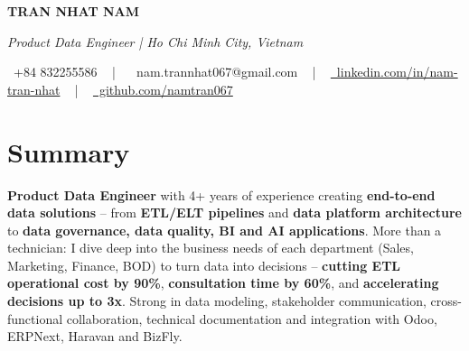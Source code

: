 \documentclass[letterpaper,10pt]{article}
\newcommand{\documentTitle}[2]{
  \begin{center}
    {\Huge\bfseries #1}
    \vspace{10pt}
    \footnotesize{#2}
    \vspace{2pt}
  \end{center}
}
\begin{document}

\documentTitle{TRAN NHAT NAM}{
\vspace{3pt}

{\large\color{gray}\itshape Product Data Engineer | Ho Chi Minh City, Vietnam}

\vspace{10pt}

{
  \raisebox{-0.05\height} \faPhone\ +84 832255586} ~ | ~
{
  \raisebox{-0.15\height} \faEnvelope\ nam.trannhat067@gmail.com} ~ | ~
\href{https://www.linkedin.com/in/nam-tran-nhat/}{
  \raisebox{-0.15\height} \faLinkedin\ linkedin.com/in/nam-tran-nhat} ~ | ~
\href{https://github.com/namtran067}{
  \raisebox{-0.15\height} \faGithub\ github.com/namtran067}
}


\section{Summary}
\textbf{Product Data Engineer} with 4+ years of experience creating \textbf{end-to-end data solutions} -- from \textbf{ETL/ELT pipelines} and \textbf{data platform architecture} to \textbf{data governance, data quality, BI and AI applications}. More than a technician: I dive deep into the business needs of each department (Sales, Marketing, Finance, BOD) to turn data into decisions -- \textbf{cutting ETL operational cost by 90\%}, \textbf{consultation time by 60\%}, and \textbf{accelerating decisions up to 3x}. Strong in data modeling, stakeholder communication, cross-functional collaboration, technical documentation and integration with Odoo, ERPNext, Haravan and BizFly.

\end{document}
